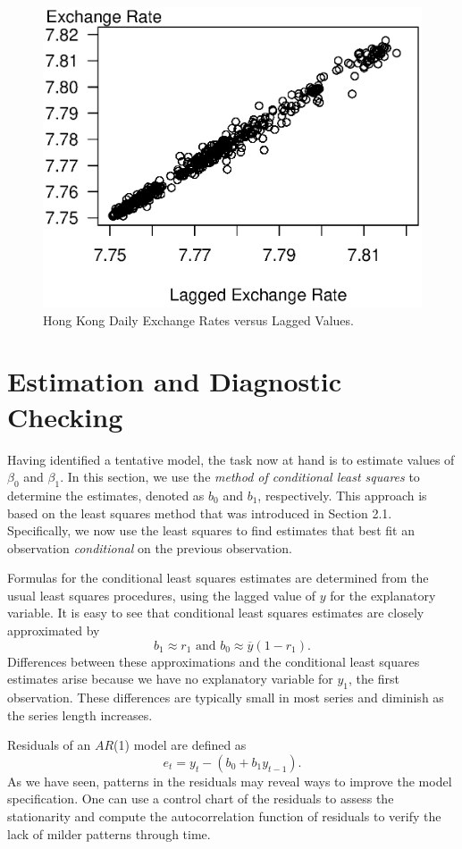 \begin{figure}[htp]
  \begin{center}
   \includegraphics[width=.5\textwidth]{Chapter8AutoReg/HKLag.eps}
    \caption{\label{F8:HKLag} \small Hong Kong Daily Exchange Rates versus Lagged Values.}
  \end{center}
\end{figure}

\section{Estimation and Diagnostic Checking}\label{S8:Estimation}

Having identified a tentative model, the task now at hand is to
estimate values of $\beta_0$ and $\beta_1$. In this section, we use
the \emph{method of conditional least squares} to determine the
estimates, denoted as $b_0$ and $b_1$, respectively. This approach
is based on the least squares method that was introduced in Section
2.1. Specifically, we now use the least squares to find estimates
that best fit an observation \emph{conditional} on the previous
observation.

Formulas for the conditional least squares estimates are determined
from the usual least squares procedures, using the lagged value of
$y$ for the explanatory variable. It is easy to see that conditional
least squares estimates are closely approximated by
\begin{equation*}
b_1 \approx r_1 \text{ \ \ \ \ \ \ and \ \ \ \ \ \ }b_0 \approx
\overline{y}(1-r_1).
\end{equation*}
Differences between these approximations and the conditional least
squares estimates arise because we have no explanatory variable for
$y_1$, the first observation. These differences are typically small
in most series and diminish as the series length increases.

Residuals of an $AR$(1) model are defined as
\begin{equation*}
e_t = y_t - \left( b_0 + b_1 y_{t-1} \right).
\end{equation*}
As we have seen, patterns in the residuals may reveal ways to
improve the model specification. One can use a control chart of the
residuals to assess the stationarity and compute the autocorrelation
function of residuals to verify the lack of milder patterns through
time.

